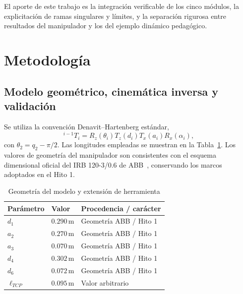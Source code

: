 \documentclass[conference,letterpaper]{IEEEtran}
\begin{document}
	El aporte de este trabajo es la integración verificable de los cinco módulos, la explicitación de ramas singulares y límites, y la separación rigurosa entre resultados del manipulador y los del ejemplo dinámico pedagógico.
	
	\section{Metodología}
	
	\subsection{Modelo geométrico, cinemática inversa y validación}
	Se utiliza la convención Denavit--Hartenberg estándar,
	\begin{equation}
		{}^{i-1}T_i=R_z(\theta_i)T_z(d_i)T_x(a_i)R_x(\alpha_i),
		\label{eq:dh}
	\end{equation}
	con \(\theta_2=q_2-\pi/2\). Las longitudes empleadas se muestran en la Tabla~\ref{tab:dimensiones}. Los valores de geometría del manipulador son consistentes con el esquema dimensional oficial del IRB 120-3/0.6 de ABB~\cite{abb}, conservando los marcos adoptados en el Hito 1.
	
	\begin{table}[!b]
		\caption{Geometría del modelo y extensión de herramienta}
		\label{tab:dimensiones}
		\centering
		\footnotesize
		\begin{tabular}{@{}lll@{}}
			\toprule
			Parámetro & Valor & Procedencia / carácter \\
			\midrule
			\(d_1\) & \(0.290\,\mathrm{m}\) & Geometría ABB / Hito 1 \\
			\(a_2\) & \(0.270\,\mathrm{m}\) & Geometría ABB / Hito 1 \\
			\(a_3\) & \(0.070\,\mathrm{m}\) & Geometría ABB / Hito 1 \\
			\(d_4\) & \(0.302\,\mathrm{m}\) & Geometría ABB / Hito 1 \\
			\(d_6\) & \(0.072\,\mathrm{m}\) & Geometría ABB / Hito 1 \\
			\(\ell_{TCP}\) & \(0.095\,\mathrm{m}\) & Valor arbitrario \\
			\bottomrule
		\end{tabular}
	\end{table}
	
\end{document}
